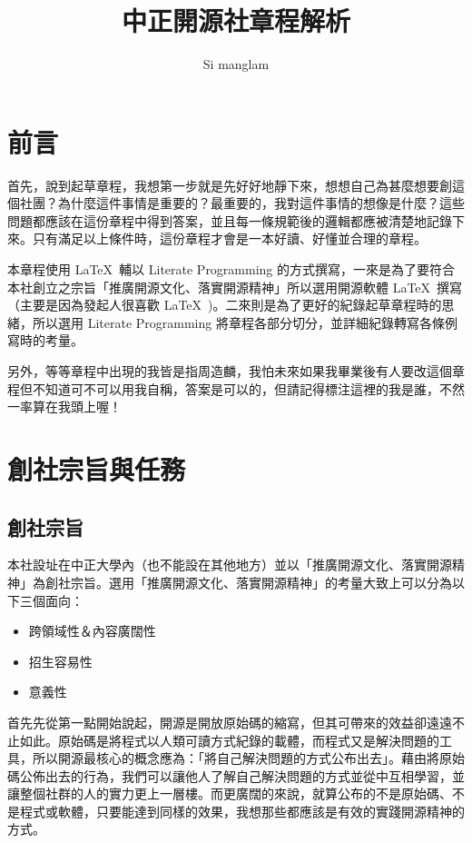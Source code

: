 \documentclass[12pt, a4paper]{NGPLB}
\title{中正開源社章程解析}
\author{Si manglam}
\begin{document}
\maketitle
\chapter{前言}

首先，說到起草章程，我想第一步就是先好好地靜下來，想想自己為甚麼想要創這個社團？為什麼這件事情是重要的？最重要的，我對這件事情的想像是什麼？這些問題都應該在這份章程中得到答案，並且每一條規範後的邏輯都應被清楚地記錄下來。只有滿足以上條件時，這份章程才會是一本好讀、好懂並合理的章程。

本章程使用 \LaTeX\ 輔以 Literate Programming 的方式撰寫，一來是為了要符合本社創立之宗旨「推廣開源文化、落實開源精神」所以選用開源軟體 \LaTeX\ 撰寫（主要是因為發起人很喜歡 \LaTeX\ )。二來則是為了更好的紀錄起草章程時的思緒，所以選用 Literate Programming 將章程各部分切分，並詳細紀錄轉寫各條例寫時的考量。

另外，等等章程中出現的我皆是指周造麟，我怕未來如果我畢業後有人要改這個章程但不知道可不可以用我自稱，答案是可以的，但請記得標注這裡的我是誰，不然一率算在我頭上喔！

\chapter{創社宗旨與任務}

\section{創社宗旨}

本社設址在中正大學內（也不能設在其他地方）並以「推廣開源文化、落實開源精神」為創社宗旨。選用「推廣開源文化、落實開源精神」的考量大致上可以分為以下三個面向：

\begin{itemize}
\item 跨領域性＆內容廣闊性
\item 招生容易性
\item 意義性
\end{itemize}

首先先從第一點開始說起，開源是開放原始碼的縮寫，但其可帶來的效益卻遠遠不止如此。原始碼是將程式以人類可讀方式紀錄的載體，而程式又是解決問題的工具，所以開源最核心的概念應為：「將自己解決問題的方式公布出去」。藉由將原始碼公佈出去的行為，我們可以讓他人了解自己解決問題的方式並從中互相學習，並讓整個社群的人的實力更上一層樓。而更廣闊的來說，就算公布的不是原始碼、不是程式或軟體，只要能達到同樣的效果，我想那些都應該是有效的實踐開源精神的方式。
\end{document}
